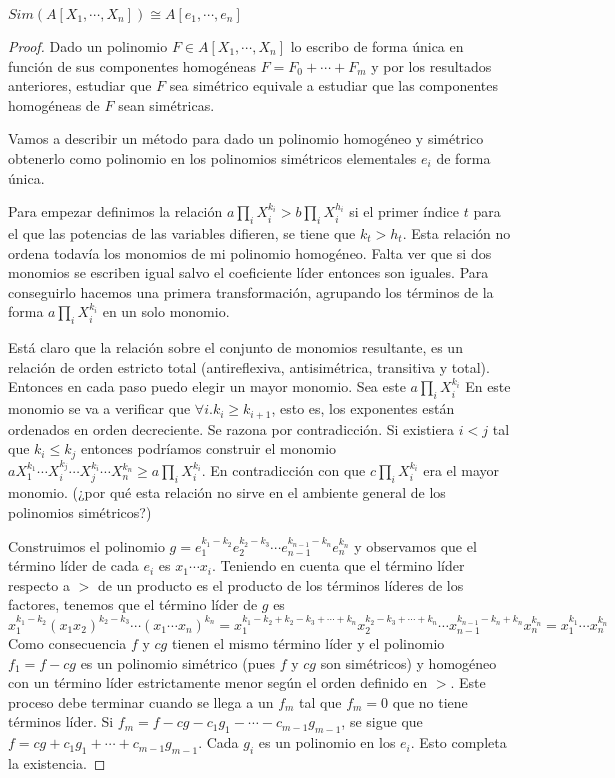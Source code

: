 \begin{theorem}
$Sim(A[X_1,\cdots,X_n]) \cong A[e_1,\cdots ,e_n]$
\end{theorem}
\begin{proof}
Dado un polinomio $F \in A[X_1,\cdots,X_n]$ lo escribo de forma única en función de sus componentes homogéneas $F = F_0 + \cdots + F_m$  y por los resultados anteriores, estudiar que $F$ sea simétrico equivale a estudiar que las componentes homogéneas de $F$ sean simétricas. 

Vamos a describir un método para dado un polinomio homogéneo y simétrico obtenerlo como polinomio en los polinomios simétricos elementales $e_i$ de forma única.

Para empezar definimos la relación $a\prod_{i} X_i^{k_i} > b\prod_{i} X_i^{h_i}$ si el primer índice $t$ para el que las potencias de las variables difieren, se tiene que $k_t > h_t$. Esta relación no ordena todavía los monomios de mi polinomio homogéneo. Falta ver que si dos monomios se escriben igual salvo el coeficiente líder entonces son iguales. Para conseguirlo hacemos una primera transformación, agrupando los términos de la forma $a\prod_{i} X_i^{k_i}$ en un solo monomio. 

Está claro que la relación sobre el conjunto de monomios resultante, es un relación de orden estricto total (antireflexiva, antisimétrica, transitiva y total). Entonces en cada paso puedo elegir un mayor monomio. Sea este $a\prod_{i} X_i^{k_i}$ En este monomio se va a verificar que $\forall i.k_i \ge k_{i+1}$, esto es, los exponentes están ordenados en orden decreciente. Se razona por contradicción. Si existiera $i < j$ tal que $k_i \le k_j$ entonces podríamos construir el monomio $aX_1^{k_1} \cdots X_i^{k_j} \cdots X_j^{k_i} \cdots X_n^{k_n} \ge a\prod_{i} X_i^{k_i}$. En contradicción con que $c\prod_{i} X_i^{k_i}$ era el mayor monomio. (¿por qué esta relación no sirve en el ambiente general de los polinomios simétricos?)

Construimos el polinomio $g=e_1^{k_1-k_2} e_2^{k_2-k_3} \cdots e_{n-1}^{k_{n-1}-k_n}e_n^{k_n}$ y observamos que el término líder de cada $e_i$ es $x_1 \cdots x_i$. Teniendo en cuenta que el término líder respecto a $>$ de un producto es el producto de los términos líderes de los factores, tenemos que el término líder de $g$ es $$x_1^{k_1-k_2}(x_1x_2)^{k_2-k_3} \cdots (x_1 \cdots x_n)^{k_n} = x_1^{k_1-k_2+k_2-k_3+\cdots+k_n} x_2^{k_2-k_3+\cdots+k_n} \cdots x_{n-1}^{k_{n-1}-k_n+k_n}x_n^{k_n} = x_1^{k_1} \cdots x_n^{k_n}$$ Como consecuencia $f$ y $cg$ tienen el mismo término líder y el polinomio $f_1 = f - cg$ es un polinomio simétrico (pues $f$ y $cg$ son simétricos) y homogéneo con un término líder estrictamente menor según el orden definido en $>$. Este proceso debe terminar cuando se llega a un $f_m$ tal que $f_m = 0$ que no tiene términos líder. Si $f_m = f - cg - c_1g_1 - \cdots -c_{m-1}g_{m-1}$, se sigue que $f = cg + c_1g_1+ \cdots +c_{m-1}g_{m-1}$. Cada $g_i$ es un polinomio en los $e_i$. Esto completa la existencia. 


\end{proof}
